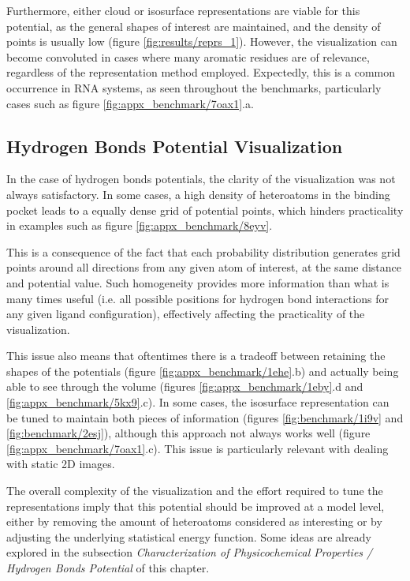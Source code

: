     Furthermore, either cloud or isosurface representations are viable for this potential, as the general shapes of interest are maintained, and the density of points is usually low (figure \ref{fig:results/reprs_1}). However, the visualization can become convoluted in cases where many aromatic residues are of relevance, regardless of the representation method employed. Expectedly, this is a common occurrence in RNA systems, as seen throughout the benchmarks, particularly cases such as figure \ref{fig:appx_benchmark/7oax1}.a.

  \subsection{Hydrogen Bonds Potential Visualization}
    In the case of hydrogen bonds potentials, the clarity of the visualization was not always satisfactory. In some cases, a high density of heteroatoms in the binding pocket leads to a equally dense grid of potential points, which hinders practicality in examples such as figure \ref{fig:appx_benchmark/8eyv}.

    This is a consequence of the fact that each probability distribution generates grid points around all directions from any given atom of interest, at the same distance and potential value. Such homogeneity provides more information than what is many times useful (i.e. all possible positions for hydrogen bond interactions for any given ligand configuration), effectively affecting the practicality of the visualization.

    This issue also means that oftentimes there is a tradeoff between retaining the shapes of the potentials (figure \ref{fig:appx_benchmark/1ehe}.b) and actually being able to see through the volume (figures \ref{fig:appx_benchmark/1eby}.d and \ref{fig:appx_benchmark/5kx9}.c). In some cases, the isosurface representation can be tuned to maintain both pieces of information (figures \ref{fig:benchmark/1i9v} and \ref{fig:benchmark/2esj}), although this approach not always works well (figure \ref{fig:appx_benchmark/7oax1}.c). This issue is particularly relevant with dealing with static 2D images.

    The overall complexity of the visualization and the effort required to tune the representations imply that this potential should be improved at a model level, either by removing the amount of heteroatoms considered as interesting or by adjusting the underlying statistical energy function. Some ideas are already explored in the subsection \textit{Characterization of Physicochemical Properties / Hydrogen Bonds Potential} of this chapter.

